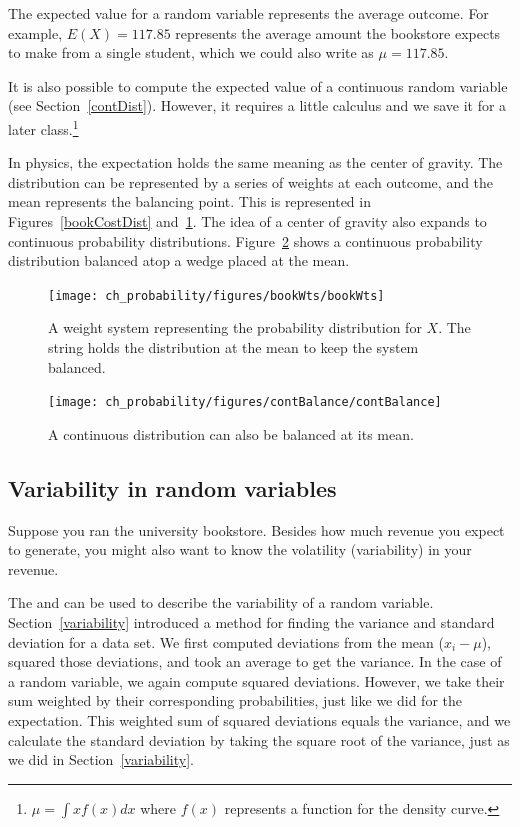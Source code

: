 The expected value for a random variable represents the average outcome. For example, $E(X)=117.85$ represents the average amount the bookstore expects to make from a single student, which we could also write as $\mu=117.85$.

It is also possible to compute the expected value of a continuous random variable (see Section~\ref{contDist}). However, it requires a little calculus and we save it for a later class.\footnote{$\mu = \int xf(x)dx$ where $f(x)$ represents a function for the density curve.}

In physics, the expectation holds the same meaning as the center of gravity. The distribution can be represented by a series of weights at each outcome, and the mean represents the balancing point. This is represented in Figures~\ref{bookCostDist} and~\ref{bookWts}. The idea of a center of gravity also expands to continuous probability distributions. Figure~\ref{contBalance} shows a continuous probability distribution balanced atop a wedge placed at the mean.

\begin{figure}
\centering
\texttt{[image: ch\_probability/figures/bookWts/bookWts]}
\caption{A weight system representing the probability distribution for $X$. The string holds the distribution at the mean to keep the system balanced.}
\label{bookWts}
\end{figure}

\begin{figure}
\centering
\texttt{[image: ch\_probability/figures/contBalance/contBalance]}
\caption{A continuous distribution can also be balanced at its mean.}
\label{contBalance}
\end{figure}



\D{\newpage}

\subsection{Variability in random variables}

Suppose you ran the university bookstore. Besides how much revenue you expect to generate, you might also want to know the volatility (variability) in your revenue. 

The  and  can be used to describe the variability of a random variable. Section~\ref{variability}
introduced a method for finding the variance and standard deviation for a data set. We first computed deviations from the mean ($x_i - \mu$), squared those deviations, and took an average to get the variance. In the case of a random variable, we again compute squared deviations. However, we take their sum weighted by their corresponding probabilities, just like we did for the expectation. This weighted sum of squared deviations equals the variance, and we calculate the standard deviation by taking the square root of the variance, just as we did in Section~\ref{variability}.

